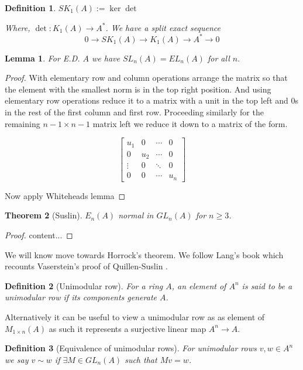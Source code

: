 \documentclass[12pt]{article}
\numberwithin{equation}{section}
\newtheorem{theorem}{Theorem}[section]
\newtheorem{definition}{Definition}[section]
\newtheorem{lemma}[theorem]{Lemma}
\begin{document}
	\begin{definition}
		$SK_1(A):= \ker \det$
		
		Where, $\det : K_1(A) \to A^*$. We have a split exact sequence
		\[ 0 \to SK_1(A) \to K_1(A) \to A^* \to 0 \]
	\end{definition}
	
	
	\begin{lemma}
		For E.D. $A$ we have $SL_n(A)=EL_n(A)$ for all $n.$
	\end{lemma}
	\begin{proof}
		With elementary row and column operations arrange the matrix so that the element with the smallest norm is in the top right position. And using elementary row operations reduce it to a matrix with a unit in the top left and 0s in the rest of the first column and first row. Proceeding similarly for the remaining $n-1 \times n-1 $ matrix left we reduce it down to a matrix of the form.
		
		\[ \begin{bmatrix}
			u_1 & 0 & \cdots & 0 \\
			0 & u_2 & \cdots & 0 \\
			\vdots & 0 & \ddots & 0\\
			0 & 0 & \cdots & u_n 
		\end{bmatrix} \]
		
	Now apply Whiteheads lemma 
	\end{proof}
	
	\begin{theorem}[Suslin]
		$E_n(A)$ normal in $GL_n(A)$ for $n \geq 3$. 
	\end{theorem}
	\begin{proof}
		content...
	\end{proof}
	
	We will know move towards Horrock's theorem. We follow Lang's book which recounts Vaserstein's proof of Quillen-Suslin \cite{lang02}.
	
	\begin{definition}[Unimodular row]
		For a ring $A$, an element of $A^n$ is said to be a unimodular row if its components generate	$A$. 
	\end{definition}
	
	Alternatively it can be useful to view a unimodular row as as element of $M_{1 \times n} (A) $ as such it represents a surjective linear map $A^n \to A$. 
	
	\begin{definition}[Equivalence of unimodular rows]
		For unimodular rows $v,w\in A^n$ we say $v \sim w $ if $\exists M \in GL_n(A)$ such that $Mv=w$.
	\end{definition}
	
\end{document}
